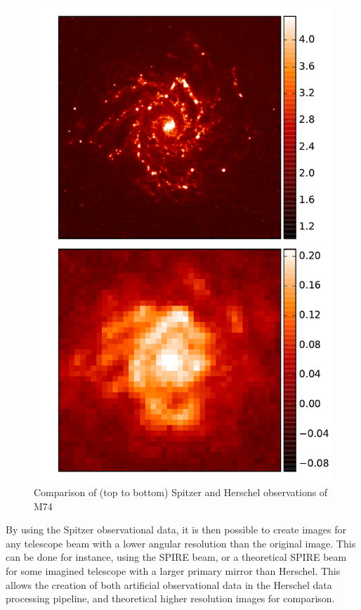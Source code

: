 \begin{figure}[H]
    \centering
    \includegraphics[width=0.9\linewidth]{figures/comparison.pdf}
    \caption[Spitzer and Herschel Observations]{Comparison of (top to bottom) Spitzer and Herschel observations of M74}
    \label{m74compare}
\end{figure}

By using the Spitzer observational data, it is then possible to create images for any telescope beam with a lower angular resolution than the original image. This can be done for instance, using the SPIRE beam, or a theoretical SPIRE beam for some imagined telescope with a larger primary mirror than Herschel. This allows the creation of both artificial observational data in the Herschel data processing pipeline, and theoretical higher resolution images for comparison.

